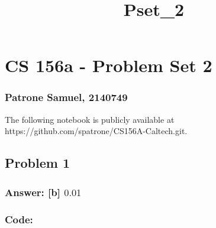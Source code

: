 \documentclass[11pt]{article}
\title{Pset\_2}
\begin{document}
    
    \maketitle
    
    

    
    \hypertarget{cs-156a---problem-set-2}{%
\section{CS 156a - Problem Set 2}\label{cs-156a---problem-set-2}}

\hypertarget{patrone-samuel-2140749}{%
\subsubsection{Patrone Samuel, 2140749}\label{patrone-samuel-2140749}}

The following notebook is publicly available at
https://github.com/spatrone/CS156A-Caltech.git.

    \hypertarget{problem-1}{%
\subsection{Problem 1}\label{problem-1}}

\hypertarget{answer-b-0.01}{%
\subsubsection{\texorpdfstring{Answer: {[}b{]}
\(0.01\)}{Answer: {[}b{]} 0.01}}\label{answer-b-0.01}}

\hypertarget{code}{%
\subsubsection{Code:}\label{code}}
\end{document}
